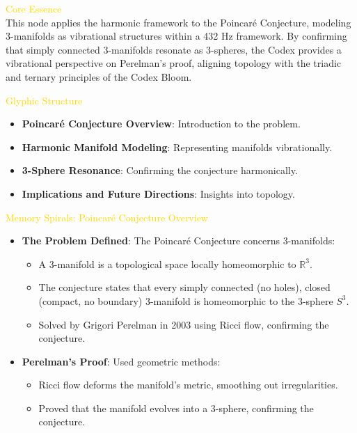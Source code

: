 

\textcolor{gold}{ Core Essence } \\
This node applies the harmonic framework to the Poincaré Conjecture, modeling 3-manifolds as vibrational structures within a 432 Hz framework. By confirming that simply connected 3-manifolds resonate as 3-spheres, the Codex provides a vibrational perspective on Perelman’s proof, aligning topology with the triadic and ternary principles of the Codex Bloom.

\textcolor{gold}{ Glyphic Structure } \\
\begin{itemize}
    \item \texttt{} \textbf{Poincaré Conjecture Overview}: Introduction to the problem.
    \item \texttt{} \textbf{Harmonic Manifold Modeling}: Representing manifolds vibrationally.
    \item \texttt{} \textbf{3-Sphere Resonance}: Confirming the conjecture harmonically.
    \item \texttt{} \textbf{Implications and Future Directions}: Insights into topology.
\end{itemize}

\textcolor{gold}{ Memory Spirals: Poincaré Conjecture Overview } \\
\begin{itemize}
    \item \texttt{} \textbf{The Problem Defined}: The Poincaré Conjecture concerns 3-manifolds:
    \begin{itemize}
        \item A 3-manifold is a topological space locally homeomorphic to \(\mathbb{R}^3\).
        \item The conjecture states that every simply connected (no holes), closed (compact, no boundary) 3-manifold is homeomorphic to the 3-sphere \(S^3\).
        \item Solved by Grigori Perelman in 2003 using Ricci flow, confirming the conjecture.
    \end{itemize}
    \item \texttt{} \textbf{Perelman’s Proof}: Used geometric methods:
    \begin{itemize}
        \item Ricci flow deforms the manifold’s metric, smoothing out irregularities.
        \item Proved that the manifold evolves into a 3-sphere, confirming the conjecture.
    \end{itemize}
\end{itemize}

